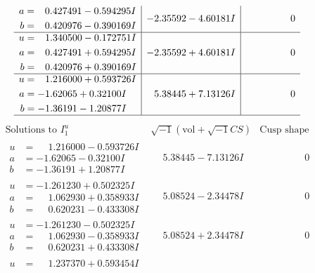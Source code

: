 \documentclass[1p]{elsarticle_modified}
\theoremstyle{definition}
\newcommand{\I}{\sqrt{-1}}
\begin{document}
$$\begin{array}{c|c|c}
\begin{aligned}
a &= \phantom{-}0.427491 - 0.594295 I \\
b &= \phantom{-}0.420976 - 0.390169 I\end{aligned}
 & -2.35592 - 4.60181 I & \phantom{-0.000000 } 0 \\ \hline\begin{aligned}
u &= \phantom{-}1.340500 - 0.172751 I \\
a &= \phantom{-}0.427491 + 0.594295 I \\
b &= \phantom{-}0.420976 + 0.390169 I\end{aligned}
 & -2.35592 + 4.60181 I & \phantom{-0.000000 } 0 \\ \hline\begin{aligned}
u &= \phantom{-}1.216000 + 0.593726 I \\
a &= -1.62065 + 0.32100 I \\
b &= -1.36191 - 1.20877 I\end{aligned}
 & \phantom{-}5.38445 + 7.13126 I & \phantom{-0.000000 } 0\\
 \hline 
 \end{array}$$\newpage$$\begin{array}{c|c|c}  
\text{Solutions to }I^u_{1}& \I (\text{vol} + \sqrt{-1}CS) & \text{Cusp shape}\\
 \hline 
\begin{aligned}
u &= \phantom{-}1.216000 - 0.593726 I \\
a &= -1.62065 - 0.32100 I \\
b &= -1.36191 + 1.20877 I\end{aligned}
 & \phantom{-}5.38445 - 7.13126 I & \phantom{-0.000000 } 0 \\ \hline\begin{aligned}
u &= -1.261230 + 0.502325 I \\
a &= \phantom{-}1.062930 + 0.358933 I \\
b &= \phantom{-}0.620231 - 0.433308 I\end{aligned}
 & \phantom{-}5.08524 - 2.34478 I & \phantom{-0.000000 } 0 \\ \hline\begin{aligned}
u &= -1.261230 - 0.502325 I \\
a &= \phantom{-}1.062930 - 0.358933 I \\
b &= \phantom{-}0.620231 + 0.433308 I\end{aligned}
 & \phantom{-}5.08524 + 2.34478 I & \phantom{-0.000000 } 0 \\ \hline\begin{aligned}
u &= \phantom{-}1.237370 + 0.593454 I \\

\end{aligned}
\end{array}$$
\end{document}
